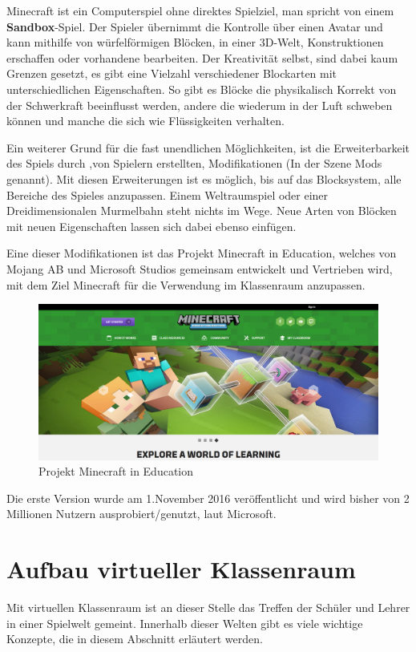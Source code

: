 Minecraft ist ein Computerspiel ohne direktes Spielziel, man spricht von einem \textbf{Sandbox}-Spiel.
Der Spieler übernimmt die Kontrolle über einen Avatar und kann mithilfe von würfelförmigen Blöcken,
in einer 3D-Welt, Konstruktionen erschaffen oder vorhandene bearbeiten. Der Kreativität selbst,
sind dabei kaum Grenzen gesetzt, es gibt eine Vielzahl verschiedener Blockarten mit unterschiedlichen
Eigenschaften. So gibt es Blöcke die physikalisch Korrekt von der Schwerkraft beeinflusst werden,
andere die wiederum in der Luft schweben können und manche die sich wie Flüssigkeiten verhalten.
\cite{WikiMinecraft}

Ein weiterer Grund für die fast unendlichen Möglichkeiten, ist die Erweiterbarkeit des Spiels durch
,von Spielern erstellten, Modifikationen (In der Szene Mods genannt). Mit diesen Erweiterungen ist es
möglich, bis auf das Blocksystem, alle Bereiche des Spieles anzupassen. Einem Weltraumspiel oder einer
Dreidimensionalen Murmelbahn steht nichts im Wege. Neue Arten von Blöcken mit neuen Eigenschaften lassen
sich dabei ebenso einfügen. 

Eine dieser Modifikationen ist das Projekt Minecraft in Education, welches
von Mojang AB und Microsoft Studios gemeinsam entwickelt und Vertrieben wird, mit dem Ziel Minecraft für die Verwendung im Klassenraum anzupassen. \cite{GamepediaMinecraft}

\begin{figure}[ht]
	\centering
	\includegraphics[width=\textwidth,height=\textheight,keepaspectratio]{images/Minecraft.png}
	\caption{Projekt Minecraft in Education \cite{HomepageMinecraftEducation}}
	\label{projectMinecraft}
\end{figure}

Die erste Version wurde am 1.November 2016 veröffentlicht und wird bisher von 2 Millionen Nutzern ausprobiert/genutzt, laut Microsoft.

\section{Aufbau virtueller Klassenraum}
Mit virtuellen Klassenraum ist an dieser Stelle das Treffen der Schüler und Lehrer in einer Spielwelt gemeint.
Innerhalb dieser Welten gibt es viele wichtige Konzepte, die in diesem Abschnitt erläutert werden.
